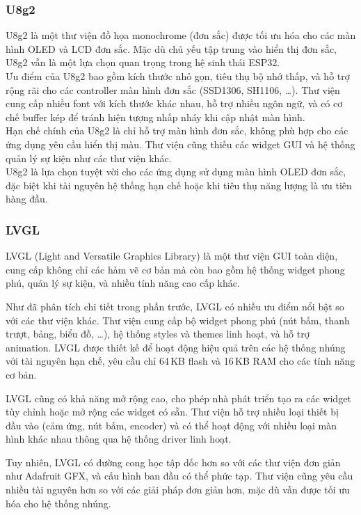 \subsubsection{U8g2}
\tab U8g2 là một thư viện đồ họa monochrome (đơn sắc) được tối ưu hóa cho các màn hình OLED và LCD đơn sắc. Mặc dù chủ yếu tập trung vào hiển thị đơn sắc, U8g2 vẫn là một lựa chọn quan trọng trong hệ sinh thái ESP32.\\
\tab Ưu điểm của U8g2 bao gồm kích thước nhỏ gọn, tiêu thụ bộ nhớ thấp, và hỗ trợ rộng rãi cho các controller màn hình đơn sắc (SSD1306, SH1106, \ldots). Thư viện cung cấp nhiều font với kích thước khác nhau, hỗ trợ nhiều ngôn ngữ, và có cơ chế buffer kép để tránh hiện tượng nhấp nháy khi cập nhật màn hình.\\
\tab Hạn chế chính của U8g2 là chỉ hỗ trợ màn hình đơn sắc, không phù hợp cho các ứng dụng yêu cầu hiển thị màu. Thư viện cũng thiếu các widget GUI và hệ thống quản lý sự kiện như các thư viện khác.\\
\tab U8g2 là lựa chọn tuyệt vời cho các ứng dụng sử dụng màn hình OLED đơn sắc, đặc biệt khi tài nguyên hệ thống hạn chế hoặc khi tiêu thụ năng lượng là ưu tiên hàng đầu.
\subsubsection{LVGL}

LVGL (Light and Versatile Graphics Library) là một thư viện GUI toàn diện, cung cấp không chỉ các hàm vẽ cơ bản mà còn bao gồm hệ thống widget phong phú, quản lý sự kiện, và nhiều tính năng cao cấp khác.

Như đã phân tích chi tiết trong phần trước, LVGL có nhiều ưu điểm nổi bật so với các thư viện khác. Thư viện cung cấp bộ widget phong phú (nút bấm, thanh trượt, bảng, biểu đồ, \ldots), hệ thống styles và themes linh hoạt, và hỗ trợ animation. LVGL được thiết kế để hoạt động hiệu quả trên các hệ thống nhúng với tài nguyên hạn chế, yêu cầu chỉ 64\,KB flash và 16\,KB RAM cho các tính năng cơ bản.

LVGL cũng có khả năng mở rộng cao, cho phép nhà phát triển tạo ra các widget tùy chỉnh hoặc mở rộng các widget có sẵn. Thư viện hỗ trợ nhiều loại thiết bị đầu vào (cảm ứng, nút bấm, encoder) và có thể hoạt động với nhiều loại màn hình khác nhau thông qua hệ thống driver linh hoạt.

Tuy nhiên, LVGL có đường cong học tập dốc hơn so với các thư viện đơn giản như Adafruit GFX, và cấu hình ban đầu có thể phức tạp. Thư viện cũng yêu cầu nhiều tài nguyên hơn so với các giải pháp đơn giản hơn, mặc dù vẫn được tối ưu hóa cho hệ thống nhúng.

